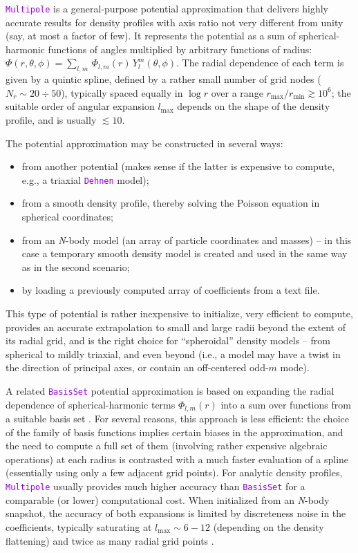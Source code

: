 \documentclass[12pt]{article}
\newcommand{\Nbody}{\textsl{N}-body\xspace}
\newcommand{\ttt}[1]{\textcolor{darkviolet}{\texttt{#1}}}
\begin{document}
\ttt{Multipole} is a general-purpose potential approximation that delivers highly accurate results for density profiles with axis ratio not very different from unity (say, at most a factor of few). It represents the potential as a sum of spherical-harmonic functions of angles multiplied by arbitrary functions of radius: $\Phi(r,\theta,\phi) = \sum_{l,m}\, \Phi_{l,m}(r)\, Y_l^m(\theta,\phi)$. The radial dependence of each term is given by a quintic spline, defined by a rather small number of grid nodes ($N_r\sim 20\div 50$), typically spaced equally in $\log r$ over a range $r_\mathrm{max}/r_\mathrm{min} \gtrsim 10^6$; the suitable order of angular expansion $l_\mathrm{max}$ depends on the shape of the density profile, and is usually $\lesssim 10$.

The potential approximation may be constructed in several ways:
\begin{itemize} \setlength{\parskip}{0pt} \setlength{\itemsep}{2pt}
\item from another potential (makes sense if the latter is expensive to compute, e.g., a triaxial \ttt{Dehnen} model);
\item from a smooth density profile, thereby solving the Poisson equation in spherical coordinates;
\item from an \Nbody model (an array of particle coordinates and masses) -- in this case a temporary smooth density model is created and used in the same way as in the second scenario;
\item by loading a previously computed array of coefficients from a text file.
\end{itemize}

This type of potential is rather inexpensive to initialize, very efficient to compute, provides an accurate extrapolation to small and large radii beyond the extent of its radial grid, and is the right choice for ``spheroidal'' density models -- from spherical to mildly triaxial, and even beyond (i.e., a model may have a twist in the direction of principal axes, or contain an off-centered odd-$m$ mode).

A related \ttt{BasisSet} potential approximation is based on expanding the radial dependence of spherical-harmonic terms $\Phi_{l,m}(r)$ into a sum over functions from a suitable basis set \cite{HernquistOstriker1992,Zhao1996}. For several reasons, this approach is less efficient: the choice of the family of basis functions implies certain biases in the approximation, and the need to compute a full set of them (involving rather expensive algebraic operations) at each radius is contrasted with a much faster evaluation of a spline (essentially using only a few adjacent grid points). For analytic density profiles, \ttt{Multipole} usually provides much higher accuracy than \ttt{BasisSet} for a comparable (or lower) computational cost. When initialized from an \Nbody snapshot, the accuracy of both expansions is limited by discreteness noise in the coefficients, typically saturating at $l_\mathrm{max} \sim 6-12$ (depending on the density flattening) and twice as many radial grid points \cite{Sanders2020}.
\end{document}
